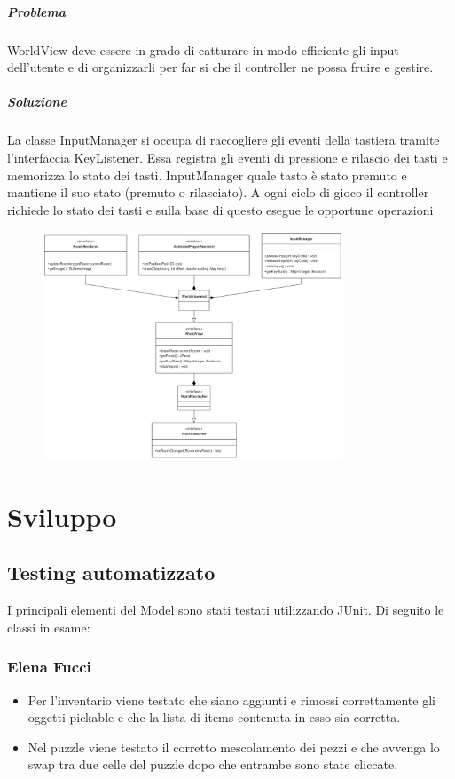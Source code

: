 \documentclass[a4paper,12pt]{report}
\begin{document}
\paragraph{Problema} %
WorldView deve essere in grado di catturare in modo efficiente gli input dell'utente e di organizzarli per far si che il controller ne possa fruire e gestire.
\paragraph{Soluzione} %
La classe InputManager si occupa di raccogliere gli eventi della tastiera tramite l'interfaccia KeyListener. Essa registra gli eventi di pressione e rilascio dei tasti e memorizza lo stato dei tasti. InputManager quale tasto è stato premuto e mantiene il suo stato (premuto o rilasciato). A ogni ciclo di gioco il controller richiede lo stato dei tasti e sulla base di questo esegue le opportune operazioni
\begin{figure}[h]
    \centering
    \includegraphics[width=0.8\textwidth]{img/WorldView.png}
    \label{img:WorldView}
\end{figure}

\chapter{Sviluppo}
\section{Testing automatizzato}
I principali elementi del Model sono stati testati utilizzando JUnit. Di seguito le classi in esame:

\subsection{Elena Fucci}
\begin{itemize}
	\item Per l’inventario viene testato che siano aggiunti e rimossi correttamente gli oggetti pickable e che la lista di items contenuta in esso sia corretta.
	\item Nel puzzle viene testato il corretto mescolamento dei pezzi e che avvenga lo swap tra due celle del puzzle dopo che entrambe sono state cliccate. 
\end{itemize}
\end{document}
